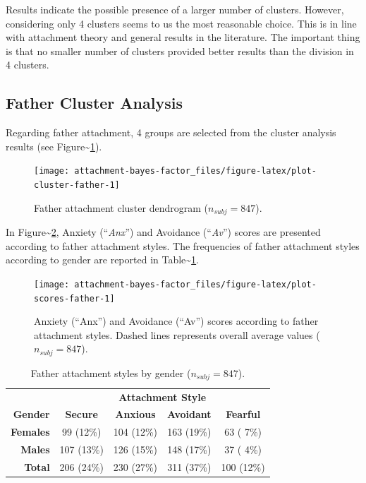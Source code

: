 \documentclass[
]{book}
\begin{document}
Results indicate the possible presence of a larger number of clusters. However, considering only 4 clusters seems to us the most reasonable choice. This is in line with attachment theory and general results in the literature. The important thing is that no smaller number of clusters provided better results than the division in 4 clusters.

\hypertarget{father-cluster-analysis}{%
\subsection{Father Cluster Analysis}\label{father-cluster-analysis}}

Regarding father attachment, 4 groups are selected from the cluster analysis results (see Figure\textasciitilde\ref{fig:plot-cluster-father}).

\begin{figure}

{\centering \texttt{[image: attachment-bayes-factor\_files/figure-latex/plot-cluster-father-1]} 

}

\caption{Father attachment cluster dendrogram ($n_{subj} = 847$).}\label{fig:plot-cluster-father}
\end{figure}

In Figure\textasciitilde\ref{fig:plot-scores-father}, Anxiety (``\emph{Anx}'') and Avoidance (``\emph{Av}'') scores are presented according to father attachment styles. The frequencies of father attachment styles according to gender are reported in Table\textasciitilde{}\ref{tab:table-cluster-father}.

\begin{figure}

{\centering \texttt{[image: attachment-bayes-factor\_files/figure-latex/plot-scores-father-1]} 

}

\caption{Anxiety (“Anx”) and Avoidance (“Av”) scores according to father attachment styles. Dashed lines represents overall average values ($n_{subj} = 847$).}\label{fig:plot-scores-father}
\end{figure}

\begin{table}[!h]

\caption{\label{tab:table-cluster-father}Father attachment styles by gender ($n_{subj} = 847$).}
\centering
\begin{tabular}[t]{>{}rcccc}
\toprule
\multicolumn{1}{c}{\textbf{ }} & \multicolumn{4}{c}{\textbf{Attachment Style}} \\
\cmidrule(l{3pt}r{3pt}){2-5}
\textbf{Gender} & \textbf{Secure} & \textbf{Anxious} & \textbf{Avoidant} & \textbf{Fearful}\\
\midrule
\textbf{Females} & 99 (12\%) & 104 (12\%) & 163 (19\%) & 63 ( 7\%)\\
\textbf{Males} & 107 (13\%) & 126 (15\%) & 148 (17\%) & 37 ( 4\%)\\
\textbf{Total} & 206 (24\%) & 230 (27\%) & 311 (37\%) & 100 (12\%)\\
\bottomrule
\end{tabular}
\end{table}
\end{document}
